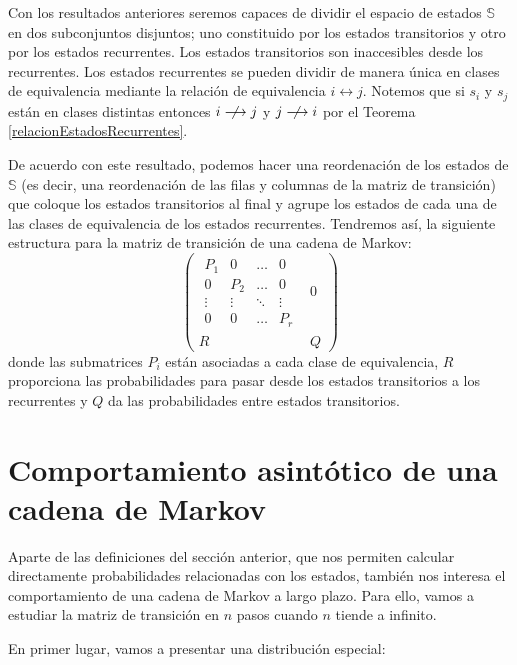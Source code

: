 Con los resultados anteriores seremos capaces de dividir el espacio de estados $\mathbb{S}$ en dos subconjuntos disjuntos; uno constituido por los estados transitorios y otro por los estados recurrentes. Los estados transitorios son inaccesibles desde los recurrentes. Los estados recurrentes se pueden dividir de manera única en clases de equivalencia mediante la relación de equivalencia $i\longleftrightarrow j$. Notemos que si $s_i$ y $s_j$ están en clases distintas entonces $i\centernot\longrightarrow j$ y $j\centernot\longrightarrow i$ por el Teorema \ref{relacionEstadosRecurrentes}.

De acuerdo con este resultado, podemos hacer una reordenación de los estados de $\mathbb{S}$ (es decir, una reordenación de las filas y columnas de la matriz de transición) que coloque los estados transitorios al final y agrupe los estados de cada una de las clases de equivalencia de los estados recurrentes. Tendremos así, la siguiente estructura para la matriz de transición de una cadena de Markov:
\[
\left(
\begin{array}{c|c}
    
    \begin{matrix}
    P_1 & 0 & \dots & 0 \\
    0 & P_2 & \dots & 0 \\
    \vdots & \vdots & \ddots & \vdots \\
    0 & 0 & \dots & P_r
    \end{matrix} & 0 \\
    \hline
     R & Q 
\end{array}
\right)
\]
donde las submatrices $P_i$ están asociadas a cada clase de equivalencia, $R$ proporciona las probabilidades para pasar desde los estados transitorios a los recurrentes y $Q$ da las probabilidades entre estados transitorios.





\section{Comportamiento asintótico de una cadena de Markov}
Aparte de las definiciones del sección anterior, que nos permiten calcular directamente probabilidades relacionadas con los estados, también nos interesa el comportamiento de una cadena de Markov a largo plazo. Para ello, vamos a estudiar la matriz de transición en $n$ pasos cuando $n$ tiende a infinito.

En primer lugar, vamos a presentar una distribución especial:

